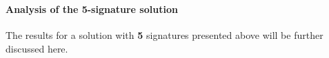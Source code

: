 \documentclass[11pt]{article}
\begin{document}
    \begin{center}
    \end{center}
    { \hspace*{\fill} \\}
    
    \begin{Verbatim}[commandchars=\\\{\}]

    \end{Verbatim}

    \begin{center}
    \end{center}
    { \hspace*{\fill} \\}
    
    \begin{center}
    \end{center}
    { \hspace*{\fill} \\}
    
    \begin{Verbatim}[commandchars=\\\{\}]

    \end{Verbatim}

    \begin{center}
    \end{center}
    { \hspace*{\fill} \\}
    
    \begin{Verbatim}[commandchars=\\\{\}]

    \end{Verbatim}

    \hypertarget{analysis-of-the-5-signature-solution}{%
\paragraph{Analysis of the 5-signature
solution}\label{analysis-of-the-5-signature-solution}}

The results for a solution with \textbf{5} signatures presented above
will be further discussed here.
\end{document}
